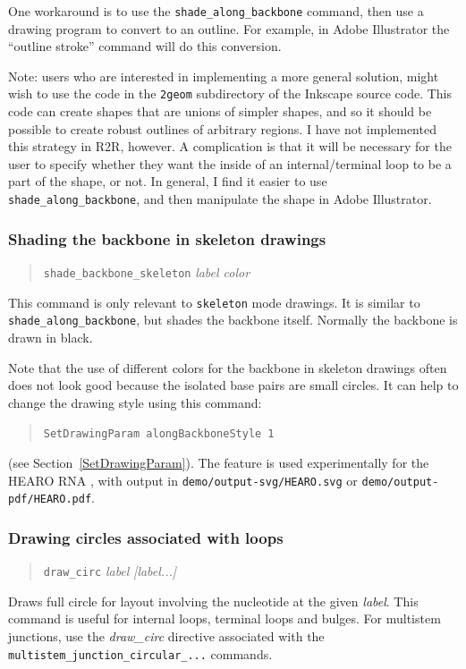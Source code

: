 \documentclass[letterpaper,12pt]{report}
\newcommand{\example}[1]{
\begin{quote}
{\raggedright
#1
}
\end{quote}
}
\newcommand{\examplett}[1]{
\example{{\tt #1}}
}
\begin{document}
One workaround is to use the {\tt shade\_along\_backbone} command, then use a drawing program to convert to an outline.  For example, 
in Adobe Illustrator the ``outline stroke'' command will do this conversion.

Note: users who are interested in implementing a more general solution, might wish to use the code in the {\tt 2geom} subdirectory of the Inkscape source code.  This code can create shapes that are unions of simpler shapes, and so it should be possible to create robust outlines of arbitrary regions.  I have not implemented this strategy in R2R, however.  A complication is that it will be necessary for the user to specify whether they want the inside of an internal/terminal loop to be a part of the shape, or not.  In general, I find it easier to use {\tt shade\_along\_backbone}, and then manipulate the shape in Adobe Illustrator.

\subsubsection{Shading the backbone in skeleton drawings}
\example{{\tt shade\_backbone\_skeleton}  \textit{label  color}}

This command is only relevant to {\tt skeleton} mode drawings.
It is similar to {\tt shade\_along\_backbone}, but shades the backbone itself.  Normally the backbone is drawn in black.

Note that the use of different colors for the backbone in skeleton drawings often does not look good because the isolated base pairs are small circles.  It can help to change the drawing style using this command:
\examplett{SetDrawingParam alongBackboneStyle 1}
(see Section~\ref{SetDrawingParam}).  The feature is used experimentally for the HEARO RNA \cite{CoolRNAs}, with output in {\tt demo/output-svg/HEARO.svg} or {\tt demo/output-pdf/HEARO.pdf}.

\subsubsection{Drawing circles associated with loops}
\example{{\tt draw\_circ} {\it label} {\it [label...]}}

Draws full circle for layout involving the nucleotide at the given {\it label}.
This command is useful for internal loops, terminal loops and bulges.
For multistem junctions, use the {\it draw\_circ} directive associated with the {\tt multistem\_junction\_circular\_...} commands.
\end{document}
